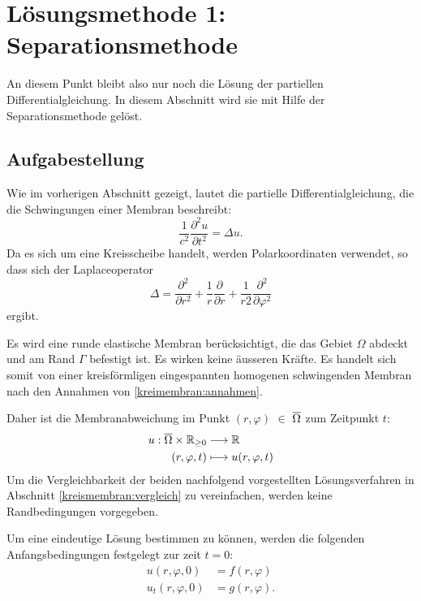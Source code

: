 %
%


\section{Lösungsmethode 1: Separationsmethode 
	\label{kreismembran:section:teil1}}
An diesem Punkt bleibt also nur noch die Lösung der partiellen Differentialgleichung. In diesem Abschnitt wird sie mit Hilfe der Separationsmethode gelöst.

\subsection{Aufgabestellung\label{sub:aufgabestellung}}
Wie im vorherigen Abschnitt gezeigt, lautet die partielle Differentialgleichung, die die Schwingungen einer Membran beschreibt:
\begin{equation*}
	\frac{1}{c^2}\frac{\partial^2u}{\partial t^2} = \Delta u.
\end{equation*}
Da es sich um eine Kreisscheibe handelt, werden Polarkoordinaten verwendet, so dass sich der Laplaceoperator
\begin{equation*}
	\Delta
	=
	\frac{\partial^2}{\partial r^2}
	+
	\frac1r
	\frac{\partial}{\partial r}
	+
	\frac{1}{r 2}
	\frac{\partial^2}{\partial\varphi^2}
	\label{buch:pde:kreis:laplace}
\end{equation*}
ergibt.

Es wird eine runde elastische Membran berücksichtigt, die das Gebiet $\Omega$ abdeckt und am Rand $\Gamma$ befestigt ist.
Es wirken keine äusseren Kräfte. Es handelt sich somit von einer kreisförmligen eingespannten homogenen schwingenden Membran nach den Annahmen von \ref{kreimembran:annahmen}.

Daher ist die Membranabweichung im Punkt $(r,\varphi)$ $\in$ $\overline{\rm \Omega}$ zum Zeitpunkt $t$:
\begin{align*}
	u: \overline{\rm \Omega} \times \mathbb{R}_{\geq 0} &\longrightarrow \mathbb{R}\\
	(r,\varphi,t) &\longmapsto u(r,\varphi,t)
\end{align*}
Um die Vergleichbarkeit der beiden nachfolgend vorgestellten Lösungsverfahren in Abschnitt \ref{kreismembran:vergleich} zu vereinfachen, werden keine Randbedingungen vorgegeben.

Um eine eindeutige Lösung bestimmen zu können, werden die folgenden Anfangsbedingungen festgelegt zur zeit $t = \text{0}$:
\begin{align*}
	u(r,\varphi, 0) &= f(r,\varphi)\\
	u_t(r,\varphi, 0) &= g(r,\varphi).
\end{align*}

